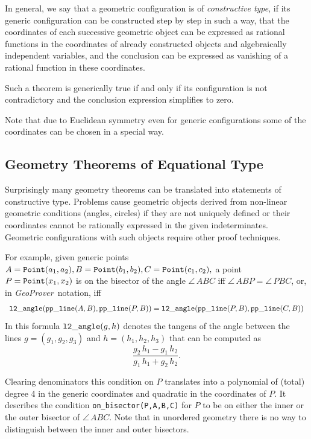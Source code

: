 \documentclass[11pt]{article}
\newcommand{\GP}{\textit{Geo\-Prover}}
\newcommand{\gf}[1]{{\tt #1}\/}
\newcommand{\formel}[1]{\[\begin{array}{l}#1\end{array}\]}
\newcommand{\hsp}{\hspace*{1cm}}
\begin{document}
In general, we say that a geometric configuration is of {\em constructive
  type}, if its generic configuration can be constructed step by step in such
a way, that the coordinates of each successive geometric object can be
expressed as rational functions in the coordinates of already constructed
objects and algebraically independent variables, and the conclusion can be
expressed as vanishing of a rational function in these coordinates.

Such a theorem is generically true if and only if its configuration is not
contradictory and the conclusion expression simplifies to zero.

Note that due to Euclidean symmetry even for generic configurations some of
the coordinates can be chosen in a special way.

\subsection{Geometry Theorems of Equational Type}

Surprisingly many geometry theorems can be translated into statements of
constructive type.  Problems cause geometric objects derived from non-linear
geo\-metric conditions (angles, circles) if they are not uniquely defined or
their coordinates cannot be rationally expressed in the given indeterminates.
Geometric configurations with such objects require other proof techniques.

For example, given generic points $A=\gf{Point}(a_1,a_2),
B=\gf{Point}(b_1,b_2), C=\gf{Point}(c_1,c_2),$ a point $P=\gf{Point}(x_1,x_2)$
is on the bisector of the angle $\angle\,ABC$ iff $\angle\,ABP=\angle\,PBC$,
or, in \GP\ notation, iff
\formel{\gf{l2\_angle}(\gf{pp\_line}(A,B),\gf{pp\_line}(P,B)) =%
  \gf{l2\_angle}(\gf{pp\_line}(P,B),\gf{pp\_line}(C,B)) } In this formula
$\gf{l2\_angle}(g,h)$ denotes the tangens of the angle between the lines
$g=(g_1,g_2,g_3)$ and $h=(h_1,h_2,h_3)$ that can be computed as
$$\frac{g_2\,h_1-g_1\,h_2}{g_1\,h_1+g_2\,h_2}.$$

Clearing denominators this condition on $P$ translates into a polynomial of
(total) degree 4 in the generic coordinates and quadratic in the coordinates
of $P$.  It describes the condition {\tt on\_bisector(P,A,B,C)} for $P$ to be
on either the inner or the outer bisector of $\angle\,ABC$.  Note that in
unordered geometry there is no way to distinguish between the inner and outer
bisectors.
\end{document}

